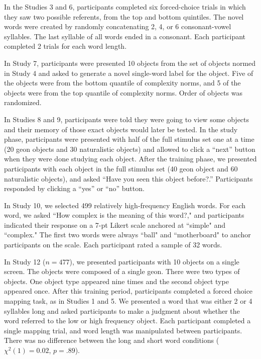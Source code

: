 \documentclass[12pt]{article}
\begin{document}
In the Studies 3 and 6, participants completed six forced-choice trials in which they saw two possible referents, from the top and bottom quintiles. The novel words were created by randomly concatenating 2, 4, or 6 consonant-vowel syllables. The last syllable of all words ended in a consonant. Each participant completed 2 trials for each word length. 

In Study 7, participants were presented 10 objects from the set of objects normed in Study 4 and asked to generate a novel single-word label for the object. Five of the objects were from the bottom quantile of complexity norms, and 5 of the objects were from the top quantile of complexity norms. Order of objects was randomized.

In Studies 8 and 9, participants were told they were going to view some objects and their memory of those exact objects would later be tested. In the study phase, participants were presented with half of the full stimulus set one at a time (20 geon objects and 30 naturalistic objects) and allowed to click a ``next'' button when they were done studying each object. After the training phase, we presented participants with each object in the full stimulus set (40 geon object and 60 naturalistic objects), and asked ``Have you seen this object before?.'' Participants responded by clicking a ``yes'' or ``no'' button.

In Study 10, we selected 499 relatively high-frequency English words. For each word, we asked ``How complex is the meaning of this word?," and participants indicated their response on a 7-pt Likert scale anchored at ``simple" and ``complex." The first two words were always ``ball" and ``motherboard" to anchor participants on the scale. Each participant rated a sample of 32 words.

In Study 12 ($n = 477$), we presented participants with 10 objects on a single screen. The objects were composed of a single geon. There were two  types of objects. One object type appeared nine times and the second object type appeared once. After this training period, participants completed a forced choice mapping task, as in Studies 1 and 5. We presented a word that was either 2 or 4 syllables long and asked participants to make a judgment about whether the word referred to the low or high frequency object. Each participant completed a single mapping trial, and word length was manipulated between participants. There was no difference between the long and short word conditions ($\chi ^2(1) = 0.02$, $p = .89$).
\end{document}
